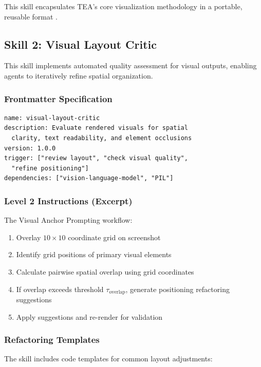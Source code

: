 \documentclass[11pt,a4paper]{article}
\begin{document}
This skill encapsulates TEA's core visualization methodology in a portable, reusable format \cite{github2024tea, claude2024agentskills}.

\subsection{Skill 2: Visual Layout Critic}

This skill implements automated quality assessment for visual outputs, enabling agents to iteratively refine spatial organization.

\subsubsection{Frontmatter Specification}

\begin{verbatim}
name: visual-layout-critic
description: Evaluate rendered visuals for spatial 
  clarity, text readability, and element occlusions
version: 1.0.0
trigger: ["review layout", "check visual quality", 
  "refine positioning"]
dependencies: ["vision-language-model", "PIL"]
\end{verbatim}

\subsubsection{Level 2 Instructions (Excerpt)}

The Visual Anchor Prompting workflow:

\begin{enumerate}
\item Overlay $10 \times 10$ coordinate grid on screenshot
\item Identify grid positions of primary visual elements
\item Calculate pairwise spatial overlap using grid coordinates
\item If overlap exceeds threshold $\tau_{\text{overlap}}$, generate positioning refactoring suggestions
\item Apply suggestions and re-render for validation
\end{enumerate}

\subsubsection{Refactoring Templates}

The skill includes code templates for common layout adjustments:
\end{document}
